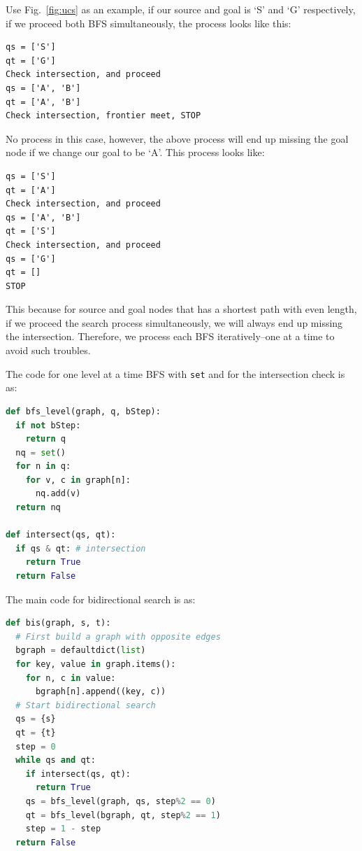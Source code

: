 \documentclass[../main.tex]{subfiles}
\begin{document}
Use Fig.~\ref{fig:ucs} as an example, if our source and goal is `S' and `G' respectively, if we proceed both  BFS simultaneously, the process looks like this:
\begin{lstlisting}[numbers=none]
qs = ['S']
qt = ['G']
Check intersection, and proceed
qs = ['A', 'B']
qt = ['A', 'B']
Check intersection, frontier meet, STOP
\end{lstlisting}
No process in this case, however, the above process will end up missing the goal node if we change our goal to be `A'. This process looks like:
\begin{lstlisting}[numbers=none]
qs = ['S']
qt = ['A']
Check intersection, and proceed
qs = ['A', 'B']
qt = ['S']
Check intersection, and proceed
qs = ['G']
qt = []
STOP
\end{lstlisting}
This because for source and goal nodes that has a shortest path with even length, if we proceed the search process simultaneously, we will always end up missing the intersection. Therefore, we process each BFS iteratively--one at a time to avoid such troubles. 

The code for one level at a time BFS with \texttt{set} and for the intersection check is as:
\begin{lstlisting}[language=Python]
def bfs_level(graph, q, bStep):
  if not bStep:
    return q
  nq = set()
  for n in q:
    for v, c in graph[n]:
      nq.add(v)
  return nq

def intersect(qs, qt):
  if qs & qt: # intersection 
    return True
  return False
\end{lstlisting}
The main code for bidirectional search is as:
\begin{lstlisting}[language=Python]
def bis(graph, s, t):
  # First build a graph with opposite edges 
  bgraph = defaultdict(list)
  for key, value in graph.items():
    for n, c in value:
      bgraph[n].append((key, c))
  # Start bidirectional search
  qs = {s}
  qt = {t}
  step = 0
  while qs and qt:
    if intersect(qs, qt):
      return True
    qs = bfs_level(graph, qs, step%2 == 0)
    qt = bfs_level(bgraph, qt, step%2 == 1)
    step = 1 - step
  return False
\end{lstlisting}
\end{document}
